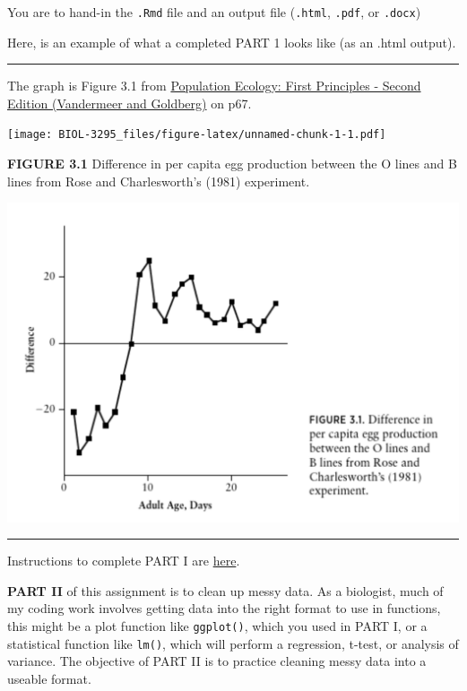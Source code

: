 \documentclass[
]{book}
\begin{document}
You are to hand-in the \texttt{.Rmd} file and an output file (\texttt{.html}, \texttt{.pdf}, or \texttt{.docx})

Here, is an example of what a completed PART 1 looks like (as an .html output).

\begin{center}\rule{0.5\linewidth}{0.5pt}\end{center}

The graph is Figure 3.1 from \href{https://ebookcentral-proquest-com.qe2a-proxy.mun.ca/lib/mun/detail.action?docID=1205619}{Population Ecology: First Principles - Second Edition (Vandermeer and Goldberg)} on p67.

\texttt{[image: BIOL-3295\_files/figure-latex/unnamed-chunk-1-1.pdf]}

\textbf{FIGURE 3.1} Difference in per capita egg production between the O lines and B lines from Rose and Charlesworth's (1981) experiment.

\includegraphics[width=0.9\linewidth]{figures/actual-fig}

\begin{center}\rule{0.5\linewidth}{0.5pt}\end{center}

Instructions to complete PART I are \protect\hyperlink{partI}{here}.

\textbf{PART II} of this assignment is to clean up messy data. As a biologist, much of my coding work involves getting data into the right format to use in functions, this might be a plot function like \texttt{ggplot()}, which you used in PART I, or a statistical function like \texttt{lm()}, which will perform a regression, t-test, or analysis of variance. The objective of PART II is to practice cleaning messy data into a useable format.
\end{document}
